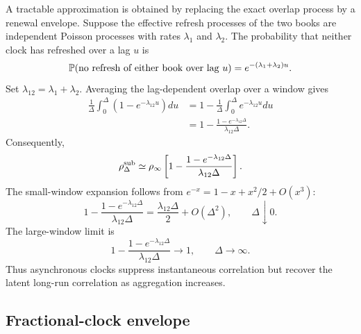 \documentclass[5p,final]{elsarticle}
\begin{document}
A tractable approximation is obtained by replacing the exact overlap process by a renewal envelope.  Suppose the effective refresh processes of the two books are independent Poisson processes with rates $\lambda_1$ and $\lambda_2$.  The probability that neither clock has refreshed over a lag $u$ is
\begin{equation}
\mathbb P(\hbox{no refresh of either book over lag }u)=e^{-(\lambda_1+\lambda_2)u}.
\end{equation}
Set $\lambda_{12}=\lambda_1+\lambda_2$.  Averaging the lag-dependent overlap over a window gives
\begin{align}
\frac{1}{\Delta}\int_0^\Delta\left(1-e^{-\lambda_{12}u}\right)du
&=1-\frac{1}{\Delta}\int_0^\Delta e^{-\lambda_{12}u}du\\
&=1-\frac{1-e^{-\lambda_{12}\Delta}}{\lambda_{12}\Delta}.
\end{align}
Consequently,
\begin{equation}
\rho^{\rm sub}_\Delta
\simeq
\rho_\infty
\left[1-\frac{1-e^{-\lambda_{12}\Delta}}{\lambda_{12}\Delta}\right].
\label{eq:sub-poisson}
\end{equation}
The small-window expansion follows from $e^{-x}=1-x+x^2/2+O(x^3)$:
\begin{equation}
1-\frac{1-e^{-\lambda_{12}\Delta}}{\lambda_{12}\Delta}
=\frac{\lambda_{12}\Delta}{2}+O(\Delta^2),
\qquad \Delta\downarrow0.
\end{equation}
The large-window limit is
\begin{equation}
1-\frac{1-e^{-\lambda_{12}\Delta}}{\lambda_{12}\Delta}\longrightarrow1,
\qquad \Delta\to\infty.
\end{equation}
Thus asynchronous clocks suppress instantaneous correlation but recover the latent long-run correlation as aggregation increases.

\subsection{Fractional-clock envelope}
\end{document}
